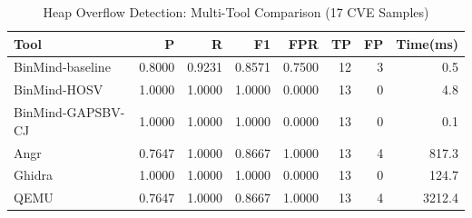 \begin{table}[htbp]
  \centering
  \caption{Heap Overflow Detection: Multi-Tool Comparison (17 CVE Samples)}
  \label{tab:heap_overflow_comparison}
  \begin{tabular}{lrrrrrrr}
    \toprule
    Tool & P & R & F1 & FPR & TP & FP & Time(ms) \\
    \midrule
    BinMind-baseline & 0.8000 & 0.9231 & 0.8571 & 0.7500 & 12 & 3 & 0.5 \\
    BinMind-HOSV & 1.0000 & 1.0000 & 1.0000 & 0.0000 & 13 & 0 & 4.8 \\
    BinMind-GAPSBV-CJ & 1.0000 & 1.0000 & 1.0000 & 0.0000 & 13 & 0 & 0.1 \\
    Angr & 0.7647 & 1.0000 & 0.8667 & 1.0000 & 13 & 4 & 817.3 \\
    Ghidra & 1.0000 & 1.0000 & 1.0000 & 0.0000 & 13 & 0 & 124.7 \\
    QEMU & 0.7647 & 1.0000 & 0.8667 & 1.0000 & 13 & 4 & 3212.4 \\
    \bottomrule
  \end{tabular}
\end{table}